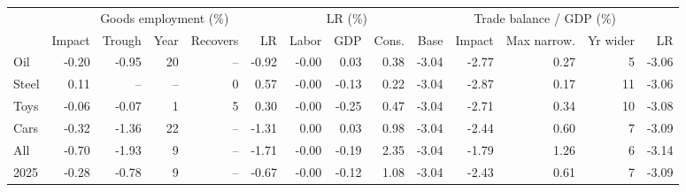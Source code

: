 \begin{tabular}{lrrrrrrrrrrrrr}
\toprule
 & \multicolumn{5}{c}{Goods employment (\%)} & \multicolumn{3}{c}{LR (\%)} & \multicolumn{5}{c}{Trade balance / GDP (\%)} \\
\cmidrule(lr){2-6}\cmidrule(lr){7-9}\cmidrule(lr){10-14}
 & Impact & Trough & Year & Recovers & LR & Labor & GDP & Cons. & Base & Impact & Max narrow. & Yr wider & LR \\
\midrule
Oil & -0.20 & -0.95 & 20 & -- & -0.92 & -0.00 & 0.03 & 0.38 & -3.04 & -2.77 & 0.27 & 5 & -3.06 \\
Steel & 0.11 & -- & -- & 0 & 0.57 & -0.00 & -0.13 & 0.22 & -3.04 & -2.87 & 0.17 & 11 & -3.06 \\
Toys & -0.06 & -0.07 & 1 & 5 & 0.30 & -0.00 & -0.25 & 0.47 & -3.04 & -2.71 & 0.34 & 10 & -3.08 \\
Cars & -0.32 & -1.36 & 22 & -- & -1.31 & 0.00 & 0.03 & 0.98 & -3.04 & -2.44 & 0.60 & 7 & -3.09 \\
All & -0.70 & -1.93 & 9 & -- & -1.71 & -0.00 & -0.19 & 2.35 & -3.04 & -1.79 & 1.26 & 6 & -3.14 \\
2025 & -0.28 & -0.78 & 9 & -- & -0.67 & -0.00 & -0.12 & 1.08 & -3.04 & -2.43 & 0.61 & 7 & -3.09 \\
\bottomrule
\end{tabular}
